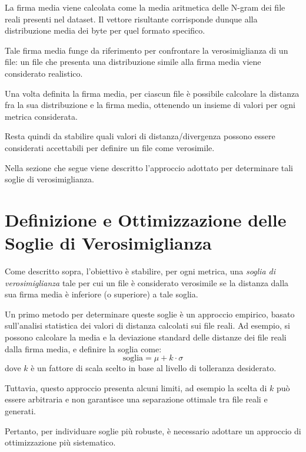 \documentclass{report}
\begin{document}
\bigskip

La firma media viene calcolata come la media aritmetica delle N-gram dei file reali presenti nel dataset.
Il vettore risultante corrisponde dunque alla distribuzione media dei byte per quel formato specifico.

Tale firma media funge da riferimento per confrontare la verosimiglianza di un file: un file che presenta una distribuzione simile alla firma media viene considerato realistico.


\bigskip

Una volta definita la firma media, per ciascun file è possibile calcolare la distanza fra la sua distribuzione e la firma media,
ottenendo un insieme di valori per ogni metrica considerata.

Resta quindi da stabilire quali valori di distanza/divergenza possono essere considerati accettabili per definire un file come verosimile.

\bigskip

Nella sezione che segue viene descritto l’approccio adottato per determinare tali soglie di verosimiglianza.




\section{Definizione e Ottimizzazione delle Soglie di Verosimiglianza}

Come descritto sopra, l'obiettivo è stabilire, per ogni metrica, una \emph{soglia di verosimiglianza} tale per cui 
un file è considerato verosimile se la distanza dalla sua firma media è inferiore (o superiore) a tale soglia.

\bigskip

Un primo metodo per determinare queste soglie è un approccio empirico, basato sull'analisi statistica dei valori di distanza calcolati sui file reali.
Ad esempio, si possono calcolare la media e la deviazione standard delle distanze dei file reali dalla firma media, e definire la soglia come:
\[\text{soglia} = \mu + k \cdot \sigma
\]
dove $k$ è un fattore di scala scelto in base al livello di tolleranza desiderato.

Tuttavia, questo approccio presenta alcuni limiti, ad esempio la scelta di $k$ può essere arbitraria e non garantisce una separazione ottimale tra file reali e generati.

\bigskip

Pertanto, per individuare soglie più robuste, è necessario adottare un approccio di ottimizzazione più sistematico.
\end{document}
